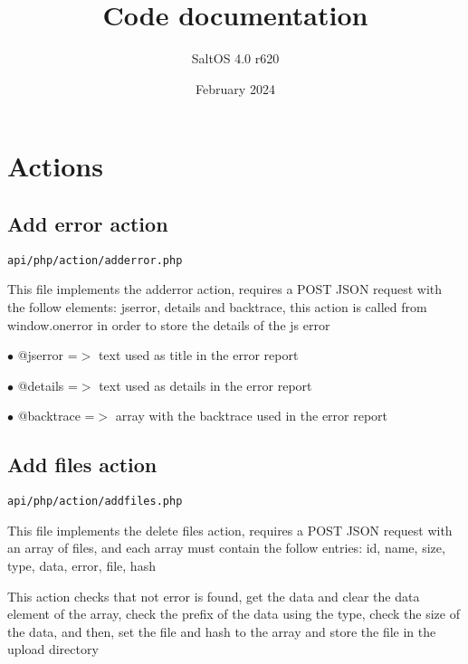 \documentclass[a4paper]{book}
\title{Code documentation}
\author{SaltOS 4.0 r620}
\begin{document}
\date{February 2024}
\maketitle
\clearpage

\tableofcontents
\clearpage


\hypertarget{toc1}{}
\chapter{Actions}

\hypertarget{toc2}{}
\section{Add error action}

\begin{lstlisting}
api/php/action/adderror.php
\end{lstlisting}

This file implements the adderror action, requires a POST JSON request
with the follow elements: jserror, details and backtrace, this action
is called from window.onerror in order to store the details of the js
error

\begin{compactitem}
\item[\color{myblue}$\bullet$] @jserror   =$>$ text used as title in the error report
\item[\color{myblue}$\bullet$] @details   =$>$ text used as details in the error report
\item[\color{myblue}$\bullet$] @backtrace =$>$ array with the backtrace used in the error report
\end{compactitem}

\hypertarget{toc3}{}
\section{Add files action}

\begin{lstlisting}
api/php/action/addfiles.php
\end{lstlisting}

This file implements the delete files action, requires a POST JSON request
with an array of files, and each array must contain the follow entries:
id, name, size, type, data, error, file, hash

This action checks that not error is found, get the data and clear the
data element of the array, check the prefix of the data using the type,
check the size of the data, and then, set the file and hash to the
array and store the file in the upload directory
\end{document}
